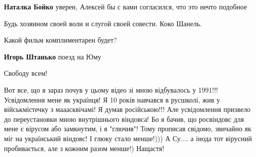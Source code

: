 \begin{itemize}
\begin{itemize}
\textbf{Наталка Бойко} уверен, Алексей бы с вами согласился, что это нечто подобное
\end{itemize}

 
Будь хозяином своей воли и слугой своей совести. Коко Шанель.

 
Какой фильм комплиментарен будет?

\begin{itemize}
 
\textbf{Игорь Штанько} поезд на Юму

\end{itemize}

 
Свободу всем!🥳

 

Вот все, що я зараз почув у цьому відео зі мною відбувалось у
1991!!! Усвідомлення мене як українця! Я 10 років навчався в русшколі, жив у
військмістечку з мааасквічамі! Я думав російською!!! Але усвідомлення призвело до
переустановки мною внутрішнього віндовса! Бо я бачив, що росвіндовс для мене є
вірусом або замкнутим, і я "глючив"! Тому прописав свідомо, звичайно як міг на
український віндовс! І глюку стало менше!))) А Су.... а інода тот вірусний
пробивається, але з кожним разом менше!) Нащастя!



\end{itemize}
